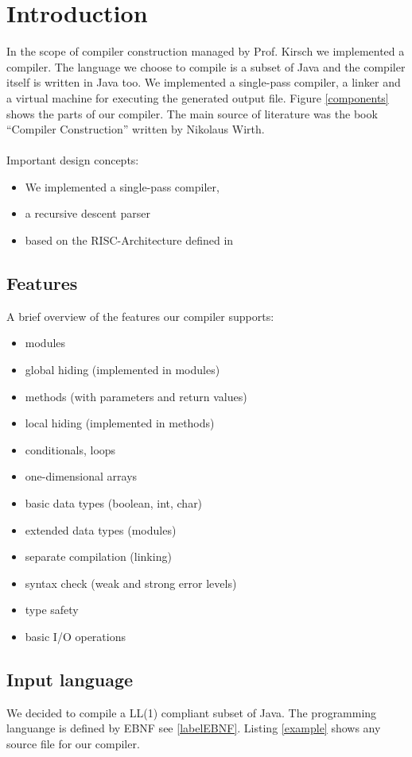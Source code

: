 \section{Introduction}
In the scope of compiler construction managed by Prof. Kirsch we implemented a compiler. The language we choose to compile is a subset of Java and the compiler itself is written in Java too. We implemented a single-pass compiler, a linker and a virtual machine for executing the generated output file. Figure \ref{components} shows the parts of our compiler. The main source of literature was the book ``Compiler Construction'' written by Nikolaus Wirth.
\paragraph{} Important design concepts:
\begin{itemize}
 \item We implemented a single-pass compiler, 
 \item a recursive descent parser 
 \item based on the RISC-Architecture defined in %
\end{itemize}
\subsection{Features}A brief overview of the features our compiler supports:
\begin{itemize}
\item modules
\item global hiding (implemented in modules)
\item methods (with parameters and return values)
\item local hiding (implemented in methods)
\item conditionals, loops
\item one-dimensional arrays
\item basic data types (boolean, int, char)
\item extended data types (modules)
\item separate compilation (linking)
\item syntax check (weak and strong error levels)
\item type safety
\item basic I/O operations
\end{itemize}


\subsection{Input language}
We decided to compile a LL(1) compliant subset of Java. The programming languange is defined by EBNF see \ref{labelEBNF}.
Listing \ref{example} shows any source file for our compiler.

